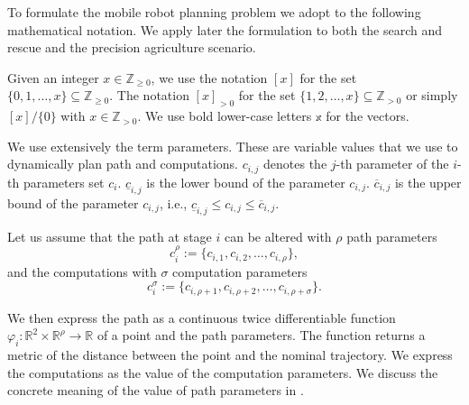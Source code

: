 To formulate the mobile robot planning problem we adopt to the following mathematical notation. We apply later the formulation to both the search and rescue and the precision agriculture scenario.

Given an integer $x\in\mathbb{Z}_{\geq 0}$, we use the notation $[x]$ for the set $\{0,1,\dots,x\}\subseteq\mathbb{Z}_{\geq 0}$. The notation $[x]_{>0}$ for the set $\{1,2,\dots,x\}\subseteq\mathbb{Z}_{> 0}$ or simply $[x]/\{0\}$ with $x\in\mathbb{Z}_{>0}$. We use bold lower-case letters $\mathbb{x}$ for the vectors.

We use extensively the term parameters. These are variable values that we use to dynamically plan path and computations. $c_{i,j}$ denotes the $j$-th parameter of the $i$-th parameters set $c_i$. $\underline{c}_{i,j}$ is the lower bound of the parameter $c_{i,j}$. $\overline{c}_{i,j}$ is the upper bound of the parameter $c_{i,j}$, i.e., $\underline{c}_{i,j}\leq c_{i,j}\leq\overline{c}_{i,j}$.

Let us assume that the path at stage $i$ can be altered with $\rho$ path parameters
\begin{equation}\label{eq:path-params}
    c_i^\rho:=\{c_{i,1},c_{i,2},\dots,c_{i,\rho}\},
\end{equation}
and the computations with $\sigma$ computation parameters 
\begin{equation}\label{eq:comp-params}
    c_i^\sigma:=\{c_{i,\rho+1},c_{i,\rho+2},\dots,c_{i,\rho+\sigma}\}.
\end{equation}

We then express the path as a continuous twice differentiable function $\varphi_i:\mathbb{R}^2\times\mathbb{R}^\rho\rightarrow\mathbb{R}$ of a point and the path parameters. The function returns a metric of the distance between the point and the nominal trajectory. We express the computations as the value of the computation parameters. We discuss the concrete meaning of the value of path parameters in .

